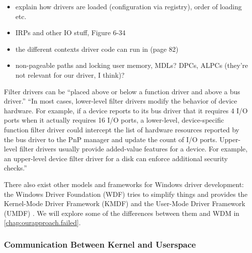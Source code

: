 \begin{itemize}
	\item explain how drivers are loaded (configuration via registry), order of loading etc.
	\item IRPs and other IO stuff, Figure 6-34
	\item the different contexts driver code can run in (page 82)
	\item non-pageable paths and locking user memory, MDLs? DPCs, ALPCs (they're not relevant for our driver, I think)?
\end{itemize}

 Filter drivers can be ``placed above or below a function driver and above a bus driver.''
``In most cases, lower-level filter drivers modify the behavior of device hardware. For example, if a device reports to its bus driver that it requires 4 I/O ports when it actually requires 16 I/O ports, a lower-level, device-specific function filter driver could intercept the list of hardware resources reported by the bus driver to the PnP manager and update the count of I/O ports. Upper-level filter drivers usually provide added-value features for a device. For example, an upper-level device filter driver for a disk can enforce additional security checks.''

There also exist other models and frameworks for Windows driver development: the Windows Driver Foundation (WDF) tries to simplify things and provides the Kernel-Mode Driver Framework (KMDF) and the User-Mode Driver Framework (UMDF) \cite{Yosifovich2017}. We will explore some of the differences between them and WDM in \autoref{chap:ourapproach.failed}.

\subsubsection{Communication Between Kernel and Userspace}
\label{chap:background.kerneldriver.communication}
